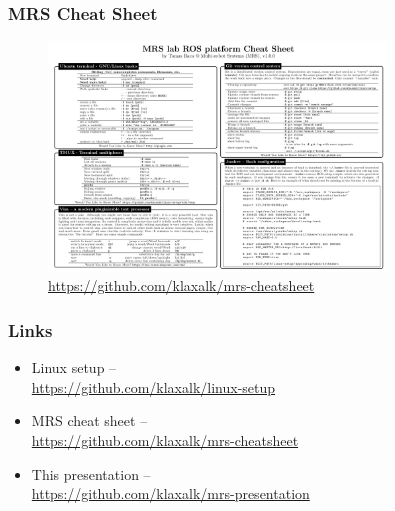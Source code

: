 \documentclass[aspectratio=1610]{beamer}
\begin{document}
\begin{frame}
  \frametitle{MRS Cheat Sheet}
  \vspace{-1em}
  \begin{figure}
    \caption*{\url{https://github.com/klaxalk/mrs-cheatsheet}}
    \includegraphics[width=0.8\textwidth]{./fig/mrs_cheatsheet.png}
  \end{figure}

\end{frame}

\begin{frame}
  \frametitle{Links}

  \begin{itemize}
    \item Linux setup -- \\\url{https://github.com/klaxalk/linux-setup}
    \item MRS cheat sheet -- \\\url{https://github.com/klaxalk/mrs-cheatsheet}
    \item This presentation -- \\\url{https://github.com/klaxalk/mrs-presentation}
  \end{itemize}

\end{frame}

\end{document}
